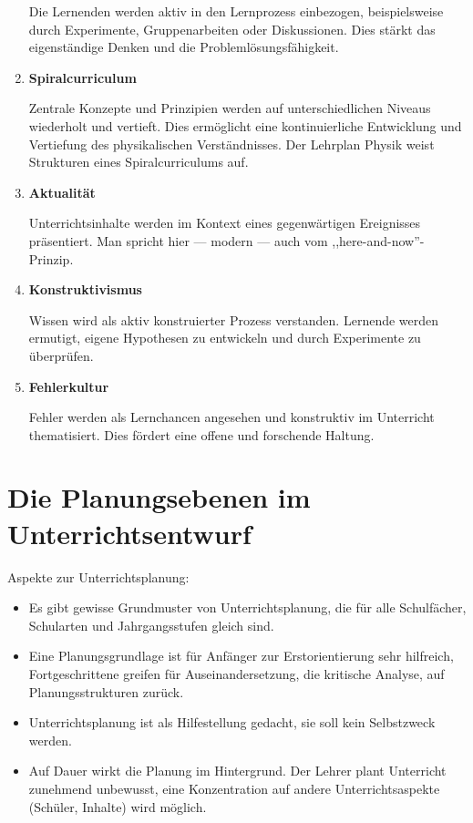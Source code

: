 \begin{enumerate}
	Die Lernenden werden aktiv in den Lernprozess einbezogen, beispielsweise durch Experimente, Gruppenarbeiten oder Diskussionen. Dies st\"{a}rkt das eigenst\"{a}ndige Denken und die Probleml\"{o}sungsf\"{a}higkeit.
	
	\item{\textbf{Spiralcurriculum}}
	
	Zentrale Konzepte und Prinzipien werden auf unterschiedlichen Niveaus wiederholt und vertieft. Dies erm\"{o}glicht eine kontinuierliche Entwicklung und Vertiefung des physikalischen Verst\"{a}ndnisses. Der Lehrplan Physik weist Strukturen eines Spiralcurriculums auf.
	
	\item{\textbf{Aktualit\"{a}t}}
	
	Unterrichtsinhalte werden im Kontext eines gegenw\"{a}rtigen
	Ereignisses pr\"{a}sentiert.
	\mip
	Man spricht hier --- modern --- auch vom ,,here-and-now''-Prinzip.
	
	\item{\textbf{Konstruktivismus}}
	
	Wissen wird als aktiv konstruierter Prozess verstanden. Lernende werden ermutigt, eigene Hypothesen zu entwickeln und durch Experimente zu \"{u}berpr\"{u}fen.
	
	\item{\textbf{Fehlerkultur}}
	
	Fehler werden als Lernchancen angesehen und konstruktiv im Unterricht thematisiert. Dies f\"{o}rdert eine offene und forschende Haltung.
	
\end{enumerate}

\bip\bip
\section{Die Planungsebenen im Unterrichtsentwurf}

Aspekte zur Unterrichtsplanung:
\begin{itemize}
	\item
	Es gibt gewisse Grundmuster von Unterrichtsplanung, die f\"{u}r alle
	Schulf\"{a}cher, Schularten und Jahrgangsstufen gleich sind.
	\item
	Eine Planungsgrundlage ist f\"{u}r Anf\"{a}nger zur
	Erstorientierung sehr hilfreich,
	Fortgeschrittene greifen f\"{u}r Auseinandersetzung, die kritische
	Analyse, auf Planungsstrukturen zur\"{u}ck.
	\item
	Unterrichtsplanung ist als Hilfestellung gedacht, sie soll kein
	Selbstzweck werden.
	\item
	Auf Dauer wirkt die Planung im Hintergrund.
	Der Lehrer plant Unterricht zunehmend unbewusst, eine Konzentration
	auf andere Unterrichtsaspekte (Sch\"{u}ler, Inhalte) wird m\"{o}glich.
\end{itemize}

